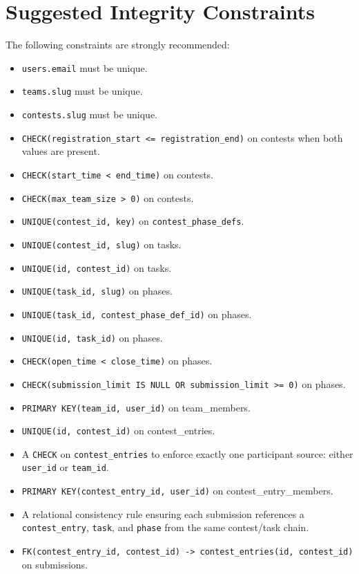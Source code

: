\documentclass[11pt,a4paper]{article}
\begin{document}
\section{Suggested Integrity Constraints}
The following constraints are strongly recommended:

\begin{itemize}
    \item \texttt{users.email} must be unique.
    \item \texttt{teams.slug} must be unique.
    \item \texttt{contests.slug} must be unique.
    \item \texttt{CHECK(registration\_start <= registration\_end)} on contests when both values are present.
    \item \texttt{CHECK(start\_time < end\_time)} on contests.
    \item \texttt{CHECK(max\_team\_size > 0)} on contests.
    \item \texttt{UNIQUE(contest\_id, key)} on \texttt{contest\_phase\_defs}.
    \item \texttt{UNIQUE(contest\_id, slug)} on tasks.
    \item \texttt{UNIQUE(id, contest\_id)} on tasks.
    \item \texttt{UNIQUE(task\_id, slug)} on phases.
    \item \texttt{UNIQUE(task\_id, contest\_phase\_def\_id)} on phases.
    \item \texttt{UNIQUE(id, task\_id)} on phases.
    \item \texttt{CHECK(open\_time < close\_time)} on phases.
    \item \texttt{CHECK(submission\_limit IS NULL OR submission\_limit >= 0)} on phases.
    \item \texttt{PRIMARY KEY(team\_id, user\_id)} on team\_members.
    \item \texttt{UNIQUE(id, contest\_id)} on contest\_entries.
    \item A \texttt{CHECK} on \texttt{contest\_entries} to enforce exactly one participant source: either \texttt{user\_id} or \texttt{team\_id}.
    \item \texttt{PRIMARY KEY(contest\_entry\_id, user\_id)} on contest\_entry\_members.
    \item A relational consistency rule ensuring each submission references a \texttt{contest\_entry}, \texttt{task}, and \texttt{phase} from the same contest/task chain.
    \item \texttt{FK(contest\_entry\_id, contest\_id) -> contest\_entries(id, contest\_id)} on submissions.

\end{itemize}
\end{document}
